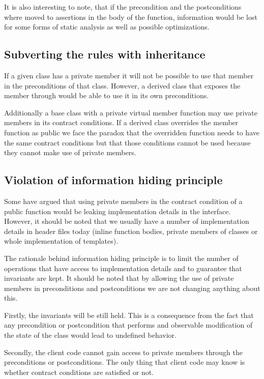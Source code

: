 It is also interesting to note, that if the precondition and the postconditions
where moved to assertions in the body of the function, information would be lost
for some forms of static analysis as well as possible optimizations.

\subsection{Subverting the rules with inheritance}

If a given class has a private member it will not be possible to use that member
in the preconditions of that class. However, a derived class that exposes the
member through  would be able to use it in its own preconditions.

Additionally a base class with a private virtual member function may use private
members in its contract conditions. If a derived class overrides the member
function as public we face the paradox that the overridden function needs to have
the same contract conditions but that those conditions cannot be used because
they cannot make use of private members.

\subsection{Violation of information hiding principle}

Some have argued that using private members in the contract condition of a
public function would be leaking implementation details in the interface.
However, it should be noted that we usually have a number of implementation
details in header files today (inline function bodies, private members of
classes or whole implementation of templates).

The rationale behind information hiding principle is to limit the number of
operations that have access to implementation details and to guarantee that
invariants are kept. It should be noted that by allowing the use of private
members in preconditions and postconditions we are not changing anything about
this.

Firstly, the invariants will be still held. This is a consequence from the fact
that any precondition or postcondition that performs and observable modification
of the state of the class would lead to undefined behavior.

Secondly, the client code cannot gain access to private members through the
preconditions or postconditions. The only thing that client code may know is
whether contract conditions are satisfied or not.


